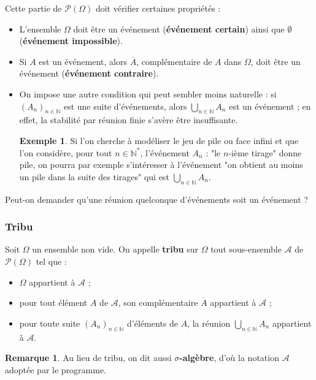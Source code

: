 \documentclass[french]{article}
\newcommand{\N}{\mathbb{N}}
\newcommand{\st}{^*}
\theoremstyle{plain}
\theoremstyle{definition}
\newtheorem*{ex}{Exemple}
\newtheorem*{rmq}{Remarque}
\theoremstyle{remark}
\begin{document}
Cette partie de $\mathcal{P}(\Omega)$ doit vérifier certaines propriétés :
\begin{itemize}
	\item L'ensemble $\Omega$ doit être un événement (\textbf{événement certain}) ainsi que $\emptyset$ (\textbf{événement impossible}).
	\item Si $A$ est un événement, alors $\overline{A}$, complémentaire de $A$ dans $\Omega$, doit être un événement (\textbf{événement contraire}).
	\item On impose une autre condition qui peut sembler moins naturelle : si $(A_n)_{n\in\N}$ est une suite d'événements, alors $\displaystyle\bigcup_{n\in\N}A_n$ est un événement ; en effet, la stabilité par réunion finie s'avère être insuffisante.
	\begin{ex}
		Si l'on cherche à modéliser le jeu de pile ou face infini et que l'on considère, pour tout $n\in\N\st$, l'événement $A_n$ : "le $n$-ième tirage" donne pile, on pourra par exemple s'intéresser à l'événement "on obtient au moins un pile dans la suite des tirages" qui est $\displaystyle\bigcup_{n\in\N}A_n$.
	\end{ex}
\end{itemize}

\begin{exo}
	Peut-on demander qu'une réunion quelconque d'événements soit un événement ?
\end{exo}

\subsubsection*{Tribu}

\begin{dfn}
	Soit $\Omega$ un ensemble non vide. On appelle \textbf{tribu} sur $\Omega$ tout sous-ensemble $\mathcal{A}$ de $\mathcal{P}(\Omega)$ tel que :
	\begin{itemize}
		\item $\Omega$ appartient à $\mathcal{A}$ ;
		\item pour tout élément $A$ de $\mathcal{A}$, son complémentaire $\overline{A}$ appartient à $\mathcal{A}$ ;
		\item pour toute suite $(A_n)_{n\in\N}$ d'éléments de $A$, la réunion $\displaystyle\bigcup_{n\in\N}A_n$ appartient à $\mathcal{A}$.
	\end{itemize}
\end{dfn}

\begin{rmq}
	Au lieu de tribu, on dit aussi \textbf{$\sigma$-algèbre}, d'où la notation $\mathcal{A}$ adoptée par le programme.
\end{rmq}
\end{document}

